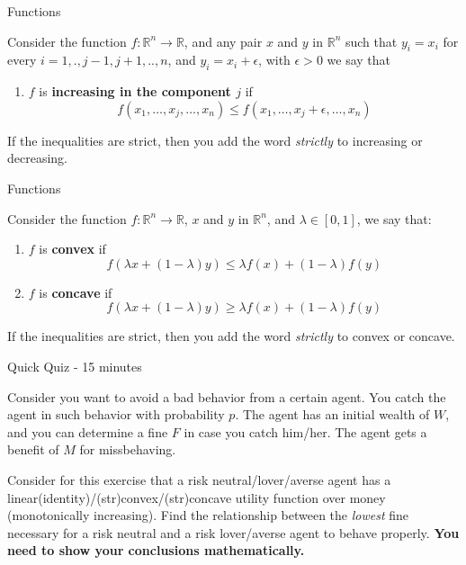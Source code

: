 \documentclass[aspectratio=169]{beamer}
\begin{document}
\begin{frame}{Functions}
    \begin{definition}
        Consider the function $f:\mathbb{R}^n\rightarrow\mathbb{R}$, and any pair $x$ and $y$ in $\mathbb{R}^n$ such that $y_i=x_i$ for every $i=1,.,j-1,j+1,..,n$, and $y_i=x_i+\epsilon$, with $\epsilon>0$ we say that
        \begin{enumerate}
            \item $f$ is \textbf{increasing in the component $j$} if $$f(x_1,\ldots,x_j,\ldots,x_n)\leq f(x_1,\ldots,x_j+\epsilon,\ldots,x_n)$$
        \end{enumerate}
    \end{definition}
    
    If the inequalities are strict, then you add the word \emph{strictly} to increasing or decreasing.
\end{frame}

\begin{frame}{Functions}
    \begin{definition}
    Consider the function $f:\mathbb{R}^n\rightarrow\mathbb{R}$, $x$ and $y$ in $\mathbb{R}^n$, and $\lambda\in [0,1]$, we say that:
    \begin{enumerate}
        \item $f$ is \textbf{convex} if $$f(\lambda x+ (1-\lambda)y)\leq \lambda f(x)+(1-\lambda)f(y)$$
        \item $f$ is \textbf{concave} if $$f(\lambda x+ (1-\lambda)y)\geq \lambda f(x)+(1-\lambda)f(y)$$
    \end{enumerate}
    \end{definition}
If the inequalities are strict, then you add the word \emph{strictly} to convex or concave.
\end{frame}

\begin{frame}{Quick Quiz - 15 minutes}

Consider you want to avoid a bad behavior from a certain agent. You catch the agent in such behavior with probability $p$. The agent has an initial wealth of $W$, and you can determine a fine $F$ in case you catch him/her. The agent gets a benefit of $M$ for missbehaving.
\vspace{0.5cm}

Consider for this exercise that a risk neutral/lover/averse agent has a linear(identity)/(str)convex/(str)concave utility function over money (monotonically increasing). Find the relationship between the \emph{lowest} fine necessary for a risk neutral and a risk lover/averse agent to behave properly. \textbf{You need to show your conclusions mathematically.}
    
\end{frame}
\end{document}
